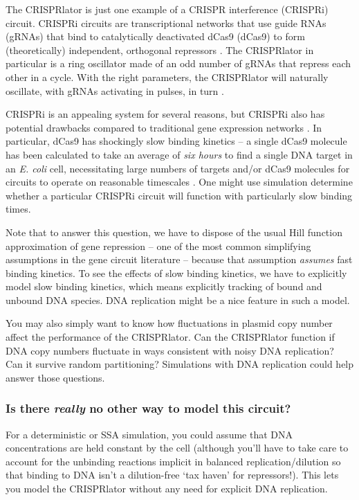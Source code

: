 \documentclass[preprint,12pt]{oldplainarticle}
\begin{document}
The CRISPRlator is just one example of a CRISPR interference (CRISPRi) circuit. CRISPRi circuits are transcriptional networks that use guide RNAs (gRNAs) that bind to catalytically deactivated dCas9 (dCas9) to form (theoretically) independent, orthogonal repressors \cite{Kiani2014, Nielsen2014, Gander2017}. The CRISPRlator in particular is a ring oscillator made of an odd number of gRNAs that repress each other in a cycle. With the right parameters, the CRISPRlator will naturally oscillate, with gRNAs activating in pulses, in turn \cite{Javier2020}.

CRISPRi is an appealing system for several reasons, but CRISPRi also has potential drawbacks compared to traditional gene expression networks \cite{Clamons2017, Zhang2018}. In particular, dCas9 has shockingly slow binding kinetics -- a single dCas9 molecule has been calculated to take an average of \emph{six hours} to find a single DNA target in an \textit{E. coli} cell, necessitating large numbers of targets and/or dCas9 molecules for circuits to operate on reasonable timescales \cite{Jones2017}. One might use simulation determine whether a particular CRISPRi circuit will function with particularly slow binding times. 

Note that to answer this question, we have to dispose of the usual Hill function approximation of gene repression -- one of the most common simplifying assumptions in the gene circuit literature -- because that assumption \emph{assumes} fast binding kinetics. To see the effects of slow binding kinetics, we have to explicitly model slow binding kinetics, which means explicitly tracking of bound and unbound DNA species. DNA replication might be a nice feature in such a model.

You may also simply want to know how fluctuations in plasmid copy number affect the performance of the CRISPRlator. Can the CRISPRlator function if DNA copy numbers fluctuate in ways consistent with noisy DNA replication? Can it survive random partitioning? Simulations with DNA replication could help answer those questions. 

\subsubsection{Is there \emph{really} no other way to model this circuit?}

For a deterministic or SSA simulation, you could assume that DNA concentrations are held constant by the cell (although you'll have to take care to account for the unbinding reactions implicit in balanced replication/dilution so that binding to DNA isn't a dilution-free `tax haven' for repressors!). This lets you model the CRISPRlator without any need for explicit DNA replication.
\end{document}
